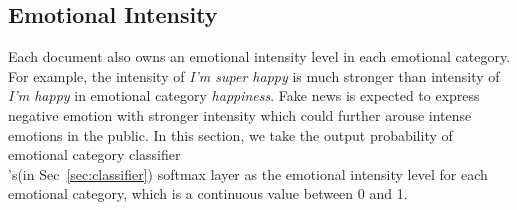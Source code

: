 \documentclass[conference]{IEEEtran}
\newcommand{\kai}[1]{\textcolor{blue}{Kai: {#1}}}
\begin{document}
	\subsection{Emotional Intensity}
	
	Each document also owns an emotional intensity level in each emotional category. For example, the intensity of {\em I'm super happy} is much stronger than intensity of {\em I'm happy} in emotional category {\em happiness}. Fake news is expected to express negative emotion with stronger intensity which could further arouse intense emotions in the public. In this section, we take the output probability of emotional category classifier\\’s(in Sec~\ref{sec:classifier}) softmax layer as the emotional intensity level for each emotional category, which is a continuous value between 0 and 1.
	
\end{document}
